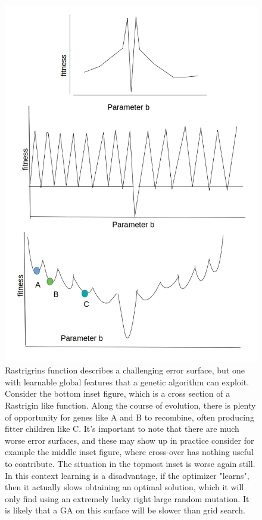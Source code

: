 \begin{figure}
\centering
      \label{fig:test1}
      \centering
      \includegraphics[scale=0.75]{figures/spectrum_worst_error_surfaces2.jpg}
      \caption[Hypothetical Error Functions, Worse than Rastrigrins function]{Rastrigrins function describes a challenging error surface, but one with learnable global features that a genetic algorithm can exploit. Consider the bottom inset figure, which is a cross section of a Rastrigin like function. Along the course of evolution, there is plenty of opportunity for genes like A and B to recombine, often producing fitter children like C. It's important to note that there are much worse error surfaces, and these may show up in practice consider for example the middle inset figure, where cross-over has nothing useful to contribute.
      The situation in the topmost inset is worse again still. In this context learning is a disadvantage, if the optimizer "learns", then it actually slows obtaining an optimal solution, which it will only find using an extremely lucky right large random mutation. It is likely that a GA on this surface will be slower than grid search.}
      \label{fig:test2}
\end{figure}      
